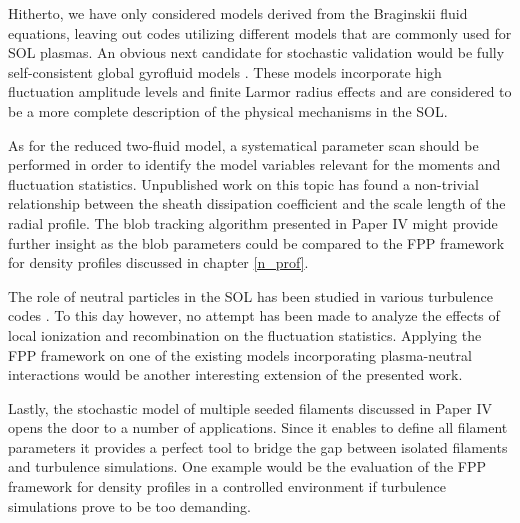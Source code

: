 Hitherto, we have only considered models derived from the Braginskii fluid equations, leaving out codes utilizing different models that are commonly used for SOL plasmas. An obvious next candidate for stochastic validation would be fully self-consistent global gyrofluid models \cite{madsen2013full,wiesenberger2014gyrofluid,wiesenberger2014radial,held2016influence,held2018non}. These models incorporate high fluctuation amplitude levels and finite Larmor radius effects and are considered to be a more complete description of the physical mechanisms in the SOL.

As for the reduced two-fluid model, a systematical parameter scan should be performed in order to identify the model variables relevant for the moments and fluctuation statistics. Unpublished work on this topic has found a non-trivial relationship between the sheath dissipation coefficient and the scale length of the radial profile. The blob tracking algorithm presented in Paper IV might provide further insight as the blob parameters could be compared to the FPP framework for density profiles discussed in chapter \ref{n_prof}.

The role of neutral particles in the SOL has been studied in various turbulence codes
\cite{russell2011comparison,marandet2013influence,thrysoe2018plasma,bisai2018influence}. To this day however, no attempt has been made to analyze the effects of local ionization and recombination on the fluctuation statistics. Applying the FPP framework on one of the existing models incorporating plasma-neutral interactions would be another interesting extension of the presented work. 

Lastly, the stochastic model of multiple seeded filaments discussed in Paper IV opens the door to a number of applications. Since it enables to define all filament parameters it provides a perfect tool to bridge the gap between isolated filaments and turbulence simulations. One example would be the evaluation of the FPP framework for density profiles in a controlled environment if turbulence simulations prove to be too demanding. 